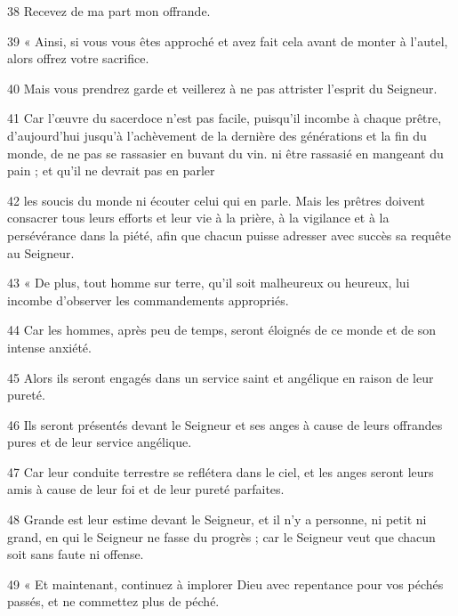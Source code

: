 \par 38 Recevez de ma part mon offrande.

\par 39 « Ainsi, si vous vous êtes approché et avez fait cela avant de monter à l'autel, alors offrez votre sacrifice.

\par 40 Mais vous prendrez garde et veillerez à ne pas attrister l'esprit du Seigneur.

\par 41 Car l'œuvre du sacerdoce n'est pas facile, puisqu'il incombe à chaque prêtre, d'aujourd'hui jusqu'à l'achèvement de la dernière des générations et la fin du monde, de ne pas se rassasier en buvant du vin. ni être rassasié en mangeant du pain ; et qu'il ne devrait pas en parler

\par 42 les soucis du monde ni écouter celui qui en parle. Mais les prêtres doivent consacrer tous leurs efforts et leur vie à la prière, à la vigilance et à la persévérance dans la piété, afin que chacun puisse adresser avec succès sa requête au Seigneur.

\par 43 « De plus, tout homme sur terre, qu'il soit malheureux ou heureux, lui incombe d'observer les commandements appropriés.

\par 44 Car les hommes, après peu de temps, seront éloignés de ce monde et de son intense anxiété.

\par 45 Alors ils seront engagés dans un service saint et angélique en raison de leur pureté.

\par 46 Ils seront présentés devant le Seigneur et ses anges à cause de leurs offrandes pures et de leur service angélique.

\par 47 Car leur conduite terrestre se reflétera dans le ciel, et les anges seront leurs amis à cause de leur foi et de leur pureté parfaites.

\par 48 Grande est leur estime devant le Seigneur, et il n'y a personne, ni petit ni grand, en qui le Seigneur ne fasse du progrès ; car le Seigneur veut que chacun soit sans faute ni offense.

\par 49 « Et maintenant, continuez à implorer Dieu avec repentance pour vos péchés passés, et ne commettez plus de péché.

